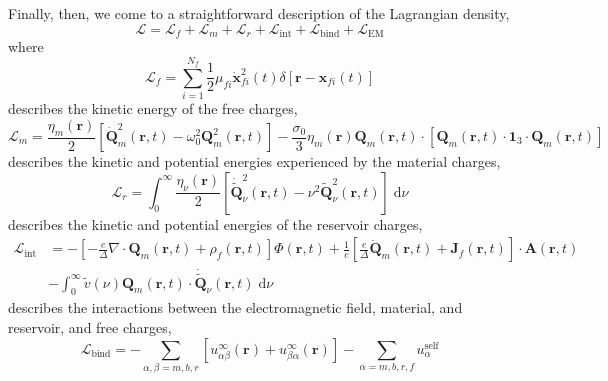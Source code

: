 \documentclass{article}
\begin{document}
Finally, then, we come to a straightforward description of the Lagrangian density,
\begin{equation}
\mathcal{L} = \mathcal{L}_f + \mathcal{L}_m + \mathcal{L}_r + \mathcal{L}_\mathrm{int} + \mathcal{L}_\mathrm{bind} + \mathcal{L}_\mathrm{EM}
\end{equation}
where
\begin{equation}
\mathcal{L}_f = \sum_{i = 1}^{N_f}\frac{1}{2}\mu_{fi}\dot{\mathbf{x}}_{fi}^2(t)\delta[\mathbf{r} - \mathbf{x}_{fi}(t)]
\end{equation}
describes the kinetic energy of the free charges,
\begin{equation}
\mathcal{L}_m = \frac{\eta_m(\mathbf{r})}{2}\left[\dot{\mathbf{Q}}_m^2(\mathbf{r},t) - \omega_0^2\mathbf{Q}_m^2(\mathbf{r},t)\right]
- \frac{\sigma_0}{3}\eta_m(\mathbf{r})\mathbf{Q}_m(\mathbf{r},t)\cdot\left[\mathbf{Q}_m(\mathbf{r},t)\cdot\bm{1}_3\cdot\mathbf{Q}_m(\mathbf{r},t)\right]
\end{equation}
describes the kinetic and potential energies experienced by the material charges,
\begin{equation}
\mathcal{L}_r = \int_0^\infty\frac{\eta_\nu(\mathbf{r})}{2}\left[\dot{\tilde{\mathbf{Q}}}_\nu^2(\mathbf{r},t) - \nu^2\tilde{\mathbf{Q}}_\nu^2(\mathbf{r},t)\right]\;\mathrm{d}\nu
\end{equation}
describes the kinetic and potential energies of the reservoir charges,
\begin{equation}
\begin{split}
\mathcal{L}_\mathrm{int} &= -\left[-\frac{e}{\Delta}\nabla\cdot\mathbf{Q}_m(\mathbf{r},t) + \rho_f(\mathbf{r},t)\right]\Phi(\mathbf{r},t) + \frac{1}{c}\left[\frac{e}{\Delta}\dot{\mathbf{Q}}_m(\mathbf{r},t) + \mathbf{J}_f(\mathbf{r},t)\right]\cdot\mathbf{A}(\mathbf{r},t)\\
&- \int_0^\infty \tilde{v}(\nu)\mathbf{Q}_m(\mathbf{r},t)\cdot\dot{\tilde{\mathbf{Q}}}_\nu(\mathbf{r},t)\;\mathrm{d}\nu
\end{split}
\end{equation}
describes the interactions between the electromagnetic field, material, and reservoir, and free charges,
\begin{equation}
\mathcal{L}_\mathrm{bind} = -\sum_{\alpha,\beta = m,b,r}\left[u_{\alpha\beta}^\infty(\mathbf{r}) + u_{\beta\alpha}^\infty(\mathbf{r})\right] - \sum_{\alpha = m,b,r,f}u_\alpha^\mathrm{self}
\end{equation}
\end{document}
